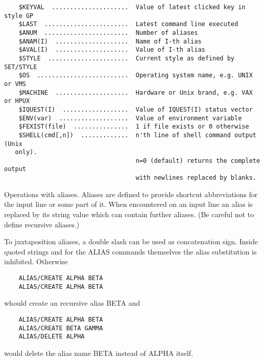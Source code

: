 \begin{verbatim}
    $KEYVAL  .....................  Value of latest clicked key in style GP
    $LAST  .......................  Latest command line executed
    $ANUM  .......................  Number of aliases
    $ANAM(I)  ....................  Name of I-th alias
    $AVAL(I)  ....................  Value of I-th alias
    $STYLE  ......................  Current style as defined by SET/STYLE
    $OS  .........................  Operating system name, e.g. UNIX or VMS
    $MACHINE  ....................  Hardware or Unix brand, e.g. VAX or HPUX
    $IQUEST(I)  ..................  Value of IQUEST(I) status vector
    $ENV(var)  ...................  Value of environment variable
    $FEXIST(file)  ...............  1 if file exists or 0 otherwise
    $SHELL(cmd[,n])  .............  n'th line of shell command output (Unix 
   only).
                                    n=0 (default) returns the complete output
                                    with newlines replaced by blanks.
\end{verbatim}


\ENDCMD
{}
\ifMENUtext
   \par
Operations with aliases.  Aliases are defined to provide shortcut 
   abbreviations for the input line or some part of it.  When encountered on 
   an input line an alias is replaced by its string value which can contain 
   further aliases.  (Be careful not to define recursive aliases.) 

   \par
To juxtaposition aliases, a double slash can be used as concatenation sign. 
   Inside quoted strings and for the ALIAS commands themselves the alias 
   substitution is inhibited.  Otherwise 
\begin{verbatim}
    ALIAS/CREATE ALPHA BETA
    ALIAS/CREATE ALPHA BETA
\end{verbatim}
   \par
whould create an recursive alias BETA and 
\begin{verbatim}
    ALIAS/CREATE ALPHA BETA
    ALIAS/CREATE BETA GAMMA
    ALIAS/DELETE ALPHA
\end{verbatim}
   \par
would delete the alias name BETA instead of ALPHA itself.  


\fi


\BEGARG
{}
\ENDARG
{}
\ENDOPT

